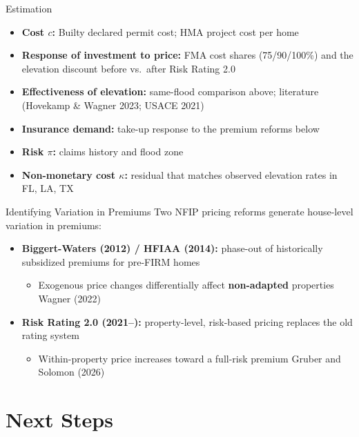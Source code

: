 \documentclass[serif, aspectratio=169, 10pt]{beamer}
\begin{document}
\begin{frame}{Estimation}
\begin{itemize}
    \item \textbf{Cost $c$:} Builty declared permit cost; HMA project cost per home
    \item \textbf{Response of investment to price:} FMA cost shares (75/90/100\%) and the elevation discount before vs.\ after Risk Rating 2.0
    \item \textbf{Effectiveness of elevation:} same-flood comparison above; literature (Hovekamp \& Wagner 2023; USACE 2021)
    \item \textbf{Insurance demand:} take-up response to the premium reforms below
    \item \textbf{Risk $\pi$:} claims history and flood zone
    \item \textbf{Non-monetary cost $\kappa$:} residual that matches observed elevation rates in FL, LA, TX
\end{itemize}
\end{frame}

\begin{frame}{Identifying Variation in Premiums}
Two NFIP pricing reforms generate house-level variation in premiums:
\begin{itemize}
    \item \textbf{Biggert-Waters (2012) / HFIAA (2014):} phase-out of historically subsidized premiums for pre-FIRM homes
    \begin{itemize}
        \item Exogenous price changes differentially affect \textbf{non-adapted} properties
        \hfill {\small\color{gray} Wagner (2022)}
    \end{itemize}
    \item \textbf{Risk Rating 2.0 (2021--):} property-level, risk-based pricing replaces the old rating system
    \begin{itemize}
        \item Within-property price increases toward a full-risk premium
        \hfill {\small\color{gray} Gruber and Solomon (2026)}
    \end{itemize}
\end{itemize}
\end{frame}

\section{Next Steps}
\end{document}
